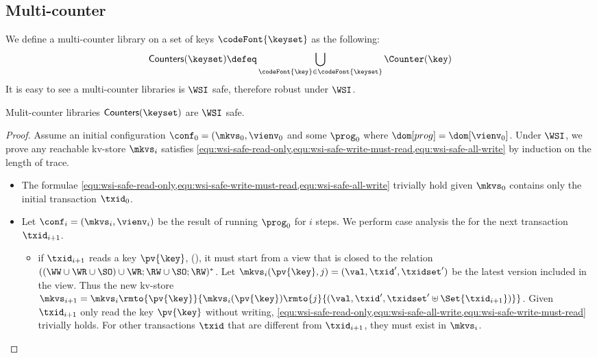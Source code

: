 \subsection{Multi-counter}
We define a multi-counter library on a set of keys \( \codeFont{\keyset} \) as the following:
\[
    \mathsf{Counters(\keyset)} \defeq \bigcup_{\codeFont{\key} \in \codeFont{\keyset} } \Counter(\key)
\]
It is easy to see a multi-counter libraries is \( \WSI \) safe, therefore robust under \( \WSI \).
\begin{theorem}
    Mulit-counter libraries \( \mathsf{Counters(\keyset)}  \) are \( \WSI \) safe.
\end{theorem}
\begin{proof}
    Assume an initial configuration \( \conf_0 = (\mkvs_0, \vienv_0 \) 
    and some \( \prog_0 \) where \( \dom[prog] = \dom[\vienv_0] \).
    Under \( \WSI \), we prove any reachable kv-store \( \mkvs_i \) satisfies \cref{equ:wsi-safe-read-only,equ:wsi-safe-write-must-read,equ:wsi-safe-all-write} by induction on the length of trace.
    \begin{itemize}
        \item {} 
            The formulae \cref{equ:wsi-safe-read-only,equ:wsi-safe-write-must-read,equ:wsi-safe-all-write} trivially hold given \( \mkvs_0 \) contains only the initial transaction \( \txid_0 \).
        \item {}
            Let \( \conf_i = (\mkvs_i, \vienv_i)\) be the result of running \( \prog_0 \) for \( i \) steps.
            We perform case analysis the for the next transaction \( \txid_{i+1} \).
            \begin{itemize}
                \item if \( \txid_{i+1}\) reads a key \( \pv{\key} \), \ie \ctrread(\pv{\key}),
                    it must start from a view that is closed to the relation \( (  (\WW \cup \WR \cup \SO) \cup \WR;\RW \cup \SO;\RW )^* \).
                    Let \( \mkvs_i(\pv{\key},j) = (\val, \txid', \txidset') \) be the latest version included in the view.
                    Thus the new kv-store \( \mkvs_{i+1} = \mkvs_{i}\rmto{\pv{\key}}{\mkvs_i(\pv{\key})\rmto{j}{(\val, \txid', \txidset' \uplus \Set{\txid_{i+1}})}} \).
                    Given \( \txid_{i+1} \) only read the key \( \pv{\key} \) without writing, \cref{equ:wsi-safe-read-only,equ:wsi-safe-all-write,equ:wsi-safe-write-must-read} trivially holds.
                    For other transactions \( \txid \) that are different from \( \txid_{i+1} \), they must exist in \( \mkvs_i \).

\end{itemize}
\end{itemize}
\end{proof}
